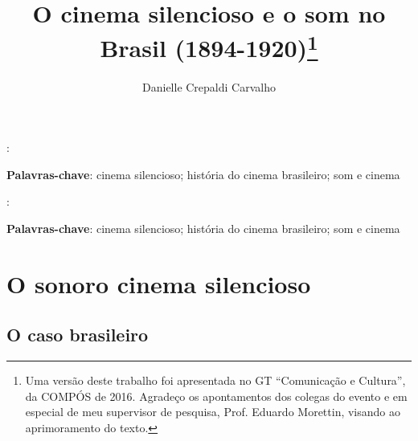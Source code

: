 \documentclass[11pt,a4paper,twoside]{article}
\title{O cinema silencioso e o som no Brasil (1894-1920)\thanks{Uma versão
deste trabalho foi apresentada no GT “Comunicação e Cultura”, da COMPÓS de
2016. Agradeço os apontamentos dos colegas do evento e em especial de meu
supervisor de pesquisa, Prof. Eduardo Morettin, visando ao aprimoramento do
texto.}}
\author{Danielle Crepaldi Carvalho}
\date{}
\renewenvironment{abstract}[1] %
{ %
  \newcommand{\keywords}{#1}
  \noindent\begin{minipage}[t]{\widthof{\abstractname:}+10pt}
  \noindent\abstractname:\end{minipage}
  \begin{minipage}[t]{\textwidth - \widthof{\abstractname:} - 10pt}}
{ %
  \end{minipage}\par\medskip
  \noindent\textbf{Palavras-chave}: \keywords\par\bigskip
}
\begin{document}
\pagestyle{fancy}
\frenchspacing

\maketitle
\thispagestyle{firststyle}

\begin{abstract}{cinema silencioso; história do cinema brasileiro; som e cinema}
  \blindtext
\end{abstract}

\begin{abstract}{cinema silencioso; história do cinema brasileiro; som e cinema}
  \blindtext
\end{abstract}
\clearpage

\section{O sonoro cinema silencioso}

\Blindtext[5]

\subsection{O caso brasileiro}

\Blindtext[7]
\end{document}
